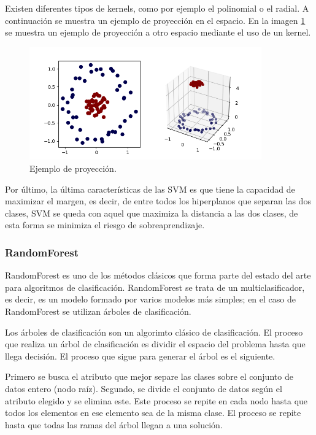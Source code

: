 Existen diferentes tipos de kernels, como por ejemplo el polinomial o el radial. A continuación se muestra un ejemplo de proyección en el espacio. En la imagen \ref{fig:215} se muestra un ejemplo de proyección a otro espacio mediante el uso de un kernel.\newline

\begin{figure}[H]
	\centering
	\includegraphics[width=100mm]{imagenes/svm_kernel_example.png}
	\caption{Ejemplo de proyección.}
	\label{fig:215}
\end{figure}
\verticalspace

Por último, la última características de las SVM es que tiene la capacidad
de maximizar el margen, es decir, de entre todos los hiperplanos que separan las dos clases, SVM se queda con aquel que maximiza la distancia a las dos clases, de esta forma se minimiza el riesgo de sobreaprendizaje.\newline

\subsubsection{RandomForest}
RandomForest \cite{breiman2001random} es uno de los métodos clásicos que forma parte del estado del arte para algoritmos de clasificación. RandomForest se trata de un multiclasificador, es decir, es un modelo formado por varios modelos más simples; en el caso de RandomForest se utilizan árboles de clasificación.\newline

Los árboles de clasificación son un algorimto clásico de clasificación. El proceso que realiza un árbol de clasificación es dividir el espacio del problema hasta que llega decisión. El proceso que sigue para generar el árbol es el siguiente.\newline

Primero se busca el atributo que mejor separe las clases sobre el conjunto de datos entero (nodo raíz). Segundo, se divide el conjunto de datos según el atributo elegido y se elimina este. Este proceso se repite en cada nodo hasta que todos los elementos en ese elemento sea de la misma clase. El proceso se repite hasta que todas las ramas del árbol llegan a una solución.\newline

